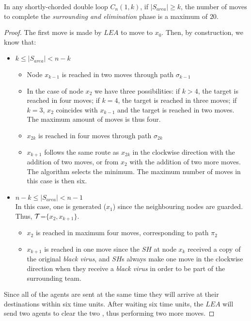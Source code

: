  \begin{theorem}
In any shortly-chorded  double loop   $C_n(1,k)$,  if $\left\vert{S_{area}}\right\vert \ge k$, 
the number of moves to complete the  {\em surrounding  and elimination} phase is a maximum of $20$.
\end{theorem}
 \begin{proof}

 The first move is made by $LEA$ to move to $x_0$. Then, by construction, we know that:
\begin{itemize}
\item $k\leq |S_{area}| <n-k$
\begin{itemize}

\item Node $x_{k-1}$ is reached in two moves through path $\sigma_{k-1}$

\item 
In the case of node $x_{2}$ we have three possibilities:  if $k > 4$,  the target is reached in four moves;  if $k = 4$,  the target is reached in three moves; if $k = 3$, $x_2$ coincides with $x_{k-1}$ and the target is reached in two moves.  The maximum amount of moves is thus four.


\item $x_{2k}$ is reached in four moves through path $\sigma_{2k}$

\item $x_{k+1}$ follows the same route as $x_{2k}$ in the clockwise direction with the addition of two moves,
or from $x_{2}$  with the addition of two more moves. The algorithm selects the minimum. The maximum number of moves in this case is then six.

\end{itemize}

 \item $n-k\leq |S_{area}| <n-1$\\
In this case, one \bv is generated ($x_1$) since the neighbouring nodes are guarded. Thus,
$\cal T$=$\{x_2,x_{k+1}\}$.
\begin{itemize}
\item $x_2$ is reached in maximum four moves, corresponding to path $\pi_2$
\item $x_{k+1}$ is reached in one move since the $SH$ at node $x_{k}$ received a copy of the original {\it black virus}, and $SH$s always make one move in the clockwise direction when they receive a {\it black virus} in order to be part of the surrounding team.
\end{itemize}

\end{itemize}

Since all of the agents are sent at the same time they will arrive at their destinations within six time units.
After waiting six time units, the $LEA$  will send two agents to clear the two \bvs, thus performing two more moves.
\end{proof}

